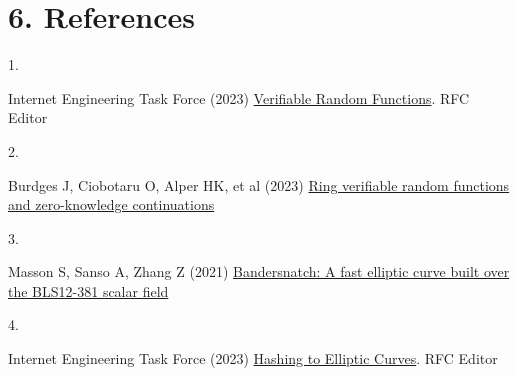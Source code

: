 \documentclass[
]{article}
\newlength{\cslhangindent}
\newlength{\csllabelwidth}
\newlength{\cslentryspacingunit} %
\newenvironment{CSLReferences}[2] %
 {%
  \setlength{\parindent}{0pt}
  \ifodd #1
  \let\oldpar\par
  \def\par{\hangindent=\cslhangindent\oldpar}
  \fi
  \setlength{\parskip}{#2\cslentryspacingunit}
 }%
 {}
\newcommand{\CSLLeftMargin}[1]{\parbox[t]{\csllabelwidth}{#1}}
\newcommand{\CSLRightInline}[1]{\parbox[t]{\linewidth - \csllabelwidth}{#1}\break}
\begin{document}
\hypertarget{references}{%
\section*{6. References}\label{references}}

\hypertarget{refs}{}
\begin{CSLReferences}{0}{0}
\leavevmode{}%
\CSLLeftMargin{1. }
\CSLRightInline{Internet Engineering Task Force (2023)
\href{https://datatracker.ietf.org/doc/rfc9381}{{Verifiable Random
Functions}}. {RFC Editor}}

\leavevmode{}%
\CSLLeftMargin{2. }
\CSLRightInline{Burdges J, Ciobotaru O, Alper HK, et al (2023)
\href{https://eprint.iacr.org/2023/002}{Ring verifiable random functions
and zero-knowledge continuations}}

\leavevmode{}%
\CSLLeftMargin{3. }
\CSLRightInline{Masson S, Sanso A, Zhang Z (2021)
\href{https://eprint.iacr.org/2021/1152}{Bandersnatch: A fast elliptic
curve built over the BLS12-381 scalar field}}

\leavevmode{}%
\CSLLeftMargin{4. }
\CSLRightInline{Internet Engineering Task Force (2023)
\href{https://datatracker.ietf.org/doc/rfc9380}{{Hashing to Elliptic
Curves}}. {RFC Editor}}

\end{CSLReferences}
\end{document}
